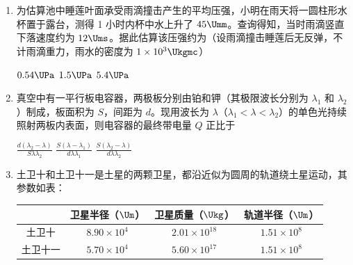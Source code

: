 \documentclass[\gkver]{gaokaozhenti}
\begin{document}
\begin{enumerate}

\item
为估算池中睡莲叶面承受雨滴撞击产生的平均压强，小明在雨天将一圆柱形水杯置于露台，测得 1 小时内杯中水上升了 $45\Umm$。查询得知，当时雨滴竖直下落速度约为 $12\Ums$。据此估算该压强约为（设雨滴撞击睡莲后无反弹，不计雨滴重力，雨水的密度为 $1\times10^{3}\Ukgmc$）

\fourchoices[answer=A]
{$0.15\UPa$}
{$0.54\UPa$}
{$1.5\UPa$}
{$5.4\UPa$}


\item
真空中有一平行板电容器，两极板分别由铂和钾（其极限波长分别为 $\lambda_{1}$ 和 $\lambda_{2}$）制成，板面积为 $S$，间距为 $d$。现用波长为 $\lambda$（$\lambda_{1}<\lambda<\lambda_{2}$）的单色光持续照射两板内表面，则电容器的最终带电量 $Q$ 正比于

{$\frac{d(\lambda_{2}-\lambda)}{S\lambda\lambda_{2}}$}
{$\frac{S(\lambda-\lambda_{1})}{d\lambda\lambda_{1}}$}
{$\frac{S(\lambda_{2}-\lambda)}{d\lambda\lambda_{2}}$}


\item
土卫十和土卫十一是土星的两颗卫星，都沿近似为圆周的轨道绕土星运动，其参数如表：

\begin{center}
\begin{tabular}{|c|c|c|c|}
\hline
 & 卫星半径（$\Um$） & 卫星质量（$\Ukg$） & 轨道半径（$\Um$） \\
\hline
土卫十 & $8.90\times10^{4}$ & $2.01\times10^{18}$ & $1.51\times10^{8}$ \\
\hline
土卫十一 & $5.70\times10^{4}$ & $5.60\times10^{17}$ & $1.51\times10^{8}$ \\
\hline
\end{tabular}
\end{center}


\end{enumerate}
\end{document}
